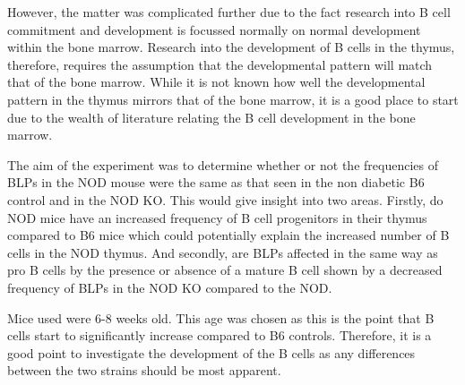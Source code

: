 However, the matter was complicated further due to the fact research into B cell commitment and development is focussed normally on normal development within the bone marrow.
Research into the development of B cells in the thymus, therefore, requires the assumption that the developmental pattern will match that of the bone marrow.
While it is not known how well the developmental pattern in the thymus mirrors that of the bone marrow, it is a good place to start due to the wealth of literature relating the B cell development in the bone marrow.

The aim of the experiment was to determine whether or not the frequencies of BLPs in the NOD mouse were the same as that seen in the non diabetic B6 control and in the NOD KO.
This would give insight into two areas.
Firstly, do NOD mice have an increased frequency of B cell progenitors in their thymus compared to B6 mice which could potentially explain the increased number of B cells in the NOD thymus.
And secondly, are BLPs affected in the same way as pro B cells by the presence or absence of a mature B cell shown by a decreased frequency of BLPs in the NOD KO compared to the NOD.



Mice used were 6-8 weeks old.
This age was chosen as this is the point that B cells start to significantly increase compared to B6 controls.
Therefore, it is a good point to investigate the development of the B cells as any differences between the two strains should be most apparent.



